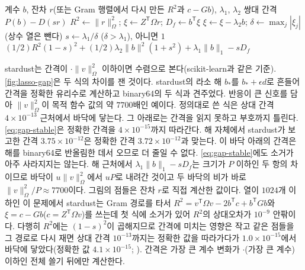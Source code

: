 \begin{algorithm}[htbp]
\begin{algorithmic}[1]
\Require 계수 $b$, 잔차 $r$(또는 Gram 행렬에서 다시 만든 $R^2$과 $c-Gb$), $\lambda_1$, $\lambda_2$
\Ensure 쌍대 간격 $P(b)-D(sr)$
\State $R^2\gets\|r\|_\Omega^2$; $\xi\gets Z^{\mathsf T}\Omega r$; $D_f\gets b^{\mathsf T}\xi$ 
\State $\xi\gets\xi-\lambda_2b$; $\delta\gets\max_j|\xi_j|$ (상수 열은 뺀다)
\State $s\gets\lambda_1/\delta$ ($\delta>\lambda_1$), 아니면 $1$ 
\State \Return $(1/2)R^2(1-s)^2+(1/2)\lambda_2\|b\|^2(1+s^2)+\lambda_1\|b\|_1-sD_f$ 
\end{algorithmic}
\caption{라소·엘라스틱넷의 소거 없는 쌍대 간격 (stardust 의 , )}
\label{alg:gap}
\end{algorithm}

stardust는 간격이 $\cdot\|v\|_\Omega^2$ 이하이면 수렴으로 본다(scikit-learn과 같은 기준). \cref{fig:lasso-gap}은 두 식의 차이를 잰 것이다. stardust의 라소 해 $b_\ast$를 $b_\ast+\epsilon d$로 흔들어 간격을 정확한 유리수로 계산하고 binary64의 두 식과 견주었다. 반응이 큰 신호를 담아 $\|v\|_\Omega^2$이 목적 함수 값의 약 $7700$배인 예이다. 정의대로 쓴 식은 상대 간격 $4\times10^{-13}$ 근처에서 바닥에 닿는다. 그 아래로는 간격을 읽지 못하고 부호까지 틀린다. \cref{eq:gap-stable}은 정확한 간격을 $4\times10^{-15}$까지 따라간다. 해 자체에서 stardust가 보고한 간격 $3.75\times10^{-12}$은 정확한 간격 $3.72\times10^{-12}$과 맞는다. 이 바닥 아래의 간격은 해를 binary64로 반올림한 데서 오므로 더 줄일 수 없다. \cref{eq:gap-stable}에도 소거가 아주 사라지지는 않는다. 해 근처에서 $\lambda_1\|b\|_1-sD_f$는 크기가 $P$ 이하인 두 항의 차이므로 바닥이 $u\|v\|_\Omega^2$에서 $uP$로 내려간 것이고 두 바닥의 비가 바로 $\|v\|_\Omega^2/P\approx7700$이다. 그림의 점들은 잔차 $r$로 직접 계산한 값이다. 열이 $1024$개 이하인 이 문제에서 stardust는 Gram 경로를 타서 $R^2=v^{\mathsf T}\Omega v-2b^{\mathsf T}c+b^{\mathsf T}Gb$와 $\xi=c-Gb$($c=Z^{\mathsf T}\Omega v$)를 쓰는데 첫 식에 소거가 있어 $R^2$의 상대오차가 $10^{-9}$ 안팎이다. 다행히 $R^2$에는 $(1-s)^2$이 곱해지므로 간격에 미치는 영향은 작고 같은 점들을 그 경로로 다시 재면 상대 간격 $10^{-13}$까지는 정확한 값을 따라가다가 $1.0\times10^{-15}$에서 바닥에 닿았다(정확한 값 $4.1\times10^{-15}$; ). 간격은 가장 큰 계수 변화가 $\cdot$(가장 큰 계수) 이하인 전체 쓸기 뒤에만 계산한다.

